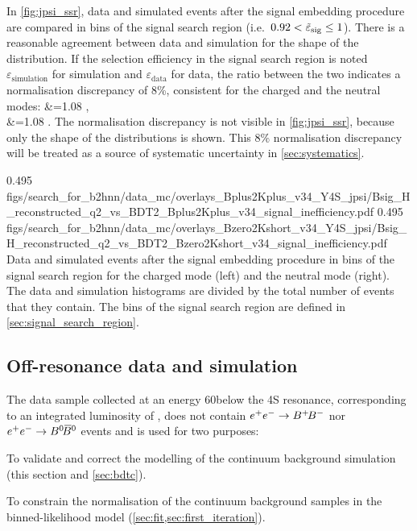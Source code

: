 In \cref{fig:jpsi_ssr}, data and simulated \BKjpsi events after the signal embedding procedure are compared in bins of the signal search region (i.e.~$0.92<\tilde{\varepsilon}_{\mathrm{sig}}\le1$).
There is a reasonable agreement between data and simulation for the shape of the distribution.
If the selection efficiency in the signal search region is noted $\varepsilon_{\mathrm{simulation}}$ for simulation and $\varepsilon_{\mathrm{data}}$ for data, the ratio between the two indicates a normalisation discrepancy of 8\%, consistent for the charged and the neutral modes:
\ba
{}&=1.08 \hspace{1cm} \BKpjpsi{},\\
&=1.08 \hspace{1cm} \BKzjpsi{}.
\ea
The normalisation discrepancy is not visible in \cref{fig:jpsi_ssr}, because only the shape of the distributions is shown.
This $8\%$ normalisation discrepancy will be treated as a source of systematic uncertainty in \cref{sec:systematics}.

\def \ssrtext {The bins of the signal search region are defined in \cref{sec:signal_search_region}.}

{0.495}
{figs/search_for_b2hnn/data_mc/overlays_Bplus2Kplus_v34_Y4S_jpsi/Bsig_H_reconstructed_q2_vs_BDT2_Bplus2Kplus_v34_signal_inefficiency.pdf}
{0.495}
{figs/search_for_b2hnn/data_mc/overlays_Bzero2Kshort_v34_Y4S_jpsi/Bsig_H_reconstructed_q2_vs_BDT2_Bzero2Kshort_v34_signal_inefficiency.pdf}
{
Data and simulated \BKjpsi events after the signal embedding procedure in bins of the signal search region for the charged mode (left) and the neutral mode (right).
The data and simulation histograms are divided by the total number of events that they contain.
\ssrtext
}
\subsection{Off-resonance data and simulation} \label{sec:offres}
The data sample collected at an energy 60\mev below the \Y4S resonance, corresponding to an integrated luminosity of \lumioff, does not contain $e^+e^-\rightarrow B^+ {\kern -0.16em B^-}$ nor $\epem\to\BzBzb$ events and is used for two purposes:
\bi
\item To validate and correct the modelling of the continuum background simulation (this section and \cref{sec:bdtc}).
\item To constrain the normalisation of the continuum background samples in the binned-likelihood model (\cref{sec:fit,sec:first_iteration}).
\ei

